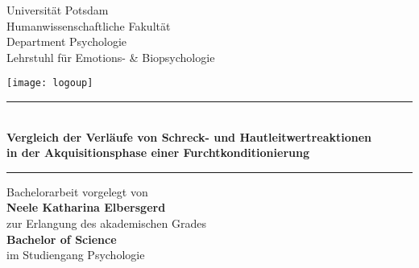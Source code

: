 \begin{titlepage}
	
	\vspace*{0.5cm} 
	\begin{center}
				
				\begin{minipage}[t]{11cm}
							\vspace*{0.1cm}
							Universität Potsdam \\
							Humanwissenschaftliche Fakultät\\
							Department Psychologie\\
							Lehrstuhl für Emotions- \& Biopsychologie
				\end{minipage}
				\begin{minipage}[t]{3cm} \vspace{-\ht\strutbox}
							\begin{center} \texttt{[image: logoup]} \end{center}
				\end{minipage} 
				  
			\vspace*{1.75cm}
	
				\begin{center}
						\rule{\textwidth}{0.5pt}\\			%
						\vspace*{0.5cm}
						\doublespacing 
						\large{\textbf{
									Vergleich der Verläufe von Schreck- und Hautleitwertreaktionen\\ %
									in der Akquisitionsphase einer Furchtkonditionierung
									}}
						\vspace*{0.5cm} 
						\rule{\textwidth}{0.5pt}			%
						        
						\normalsize	\vspace*{0.25cm} 
						
									Bachelorarbeit vorgelegt von \\
									\textbf{Neele Katharina Elbersgerd} \\
						 			 zur Erlangung des akademischen Grades\\
						 			\textbf{ Bachelor of Science} \\ 
						 			im Studiengang Psychologie
				

\end{center}
\end{center}
\end{titlepage}
